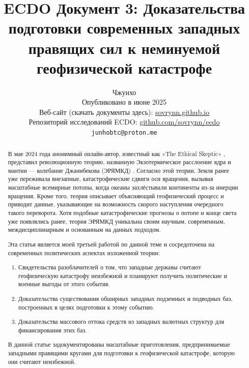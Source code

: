 \documentclass[10pt,twocolumn,letterpaper]{article}
\begin{document}
\title{ECDO Документ 3: Доказательства подготовки современных западных правящих сил к неминуемой геофизической катастрофе}

\author{Чжунхо\\
Опубликовано в июне 2025\\
Веб-сайт (скачать документы здесь): \href{https://sovrynn.github.io}{sovrynn.github.io}\\
Репозиторий исследований ECDO: \href{https://github.com/sovrynn/ecdo}{github.com/sovrynn/ecdo}\\
{\tt\small junhobtc@proton.me}
}

\maketitle

\begin{abstract}
В мае 2024 года анонимный онлайн-автор, известный как «The Ethical Skeptic» \cite{0}, представил революционную теорию, названную Экзотермическое расслоение ядра и мантии — колебание Джанибекова (ЭРЯМКД) \cite{1}. Согласно этой теории, Земля ранее уже переживала внезапные, катастрофические сдвиги оси вращения, вызывая масштабные всемирные потопы, когда океаны захлёстывали континенты из-за инерции вращения. Кроме того, теория описывает объясняющий геофизический процесс и приводит данные, указывающие на возможность скорого наступления очередного такого переворота. Хотя подобные катастрофические прогнозы о потопе и конце света уже появлялись ранее, теория ЭРЯМКД уникальна своим научным, современным, междисциплинарным и основанным на данных подходом.

Эта статья является моей третьей работой \cite{2,3} по данной теме и сосредоточена на современных политических аспектах изложенной теории:
\begin{flushleft}
\begin{enumerate}
    \item Свидетельства разоблачителей о том, что западные державы считают геофизическую катастрофу неизбежной и планируют получить политические и военные выгоды от этого события.
    \item Доказательства существования обширных западных подземных и подводных баз, построенных в целях подготовки к этому событию.
    \item Доказательства массового оттока средств из западных валютных структур для финансирования этих баз.
\end{enumerate}
\end{flushleft}

В данной статье задокументированы масштабные приготовления, предпринимаемые западными правящими кругами для подготовки к геофизической катастрофе, которую они считают неизбежной.
\end{abstract}
\end{document}
